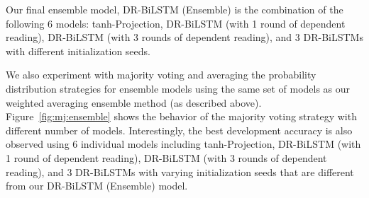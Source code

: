 \documentclass[11pt,a4paper]{article}
\begin{document}
	Our final ensemble model, DR-BiLSTM (Ensemble) is the combination of the following 6 models: tanh-Projection, DR-BiLSTM (with 1 round of dependent reading), DR-BiLSTM (with 3 rounds of dependent reading), and 3 DR-BiLSTMs with different initialization seeds.
	
	We also experiment with majority voting and averaging the probability distribution strategies for ensemble models using the same set of models as our weighted averaging ensemble method (as described above). Figure~\ref{fig:mj:ensemble} shows the behavior of the majority voting strategy with different number of models. Interestingly, the best development accuracy is also observed using 6 individual models including tanh-Projection, DR-BiLSTM (with 1 round of dependent reading), DR-BiLSTM (with 3 rounds of dependent reading), and 3 DR-BiLSTMs with varying initialization seeds that are different from our DR-BiLSTM (Ensemble) model.
	
\end{document}
